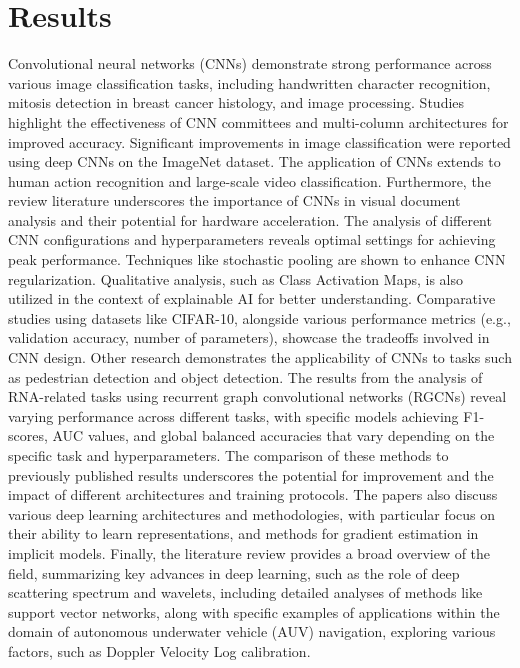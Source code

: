 \documentclass{article}
\begin{document}
\section*{Results}
Convolutional neural networks (CNNs) demonstrate strong performance across various image classification tasks, including handwritten character recognition, mitosis detection in breast cancer histology, and image processing.  Studies highlight the effectiveness of CNN committees and multi-column architectures for improved accuracy.  Significant improvements in image classification were reported using deep CNNs on the ImageNet dataset.  The application of CNNs extends to human action recognition and large-scale video classification.  Furthermore, the review literature underscores the importance of CNNs in visual document analysis and their potential for hardware acceleration.  The analysis of different CNN configurations and hyperparameters reveals optimal settings for achieving peak performance.  Techniques like stochastic pooling are shown to enhance CNN regularization. Qualitative analysis, such as Class Activation Maps, is also utilized in the context of explainable AI for better understanding.  Comparative studies using datasets like CIFAR-10, alongside various performance metrics (e.g., validation accuracy, number of parameters), showcase the tradeoffs involved in CNN design.  Other research demonstrates the applicability of CNNs to tasks such as pedestrian detection and object detection.  The results from the analysis of RNA-related tasks using recurrent graph convolutional networks (RGCNs) reveal varying performance across different tasks, with specific models achieving F1-scores, AUC values, and global balanced accuracies that vary depending on the specific task and hyperparameters.  The comparison of these methods to previously published results underscores the potential for improvement and the impact of different architectures and training protocols.  The papers also discuss various deep learning architectures and methodologies, with particular focus on their ability to learn representations, and methods for gradient estimation in implicit models.  Finally,  the literature review provides a broad overview of the field, summarizing  key advances in deep learning, such as the role of deep scattering spectrum and wavelets, including detailed analyses of methods like support vector networks, along with specific examples of applications within the domain of autonomous underwater vehicle (AUV) navigation, exploring various factors, such as Doppler Velocity Log calibration.
\end{document}
